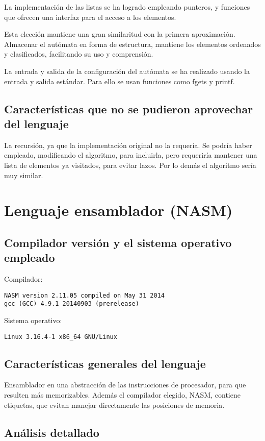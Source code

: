\documentclass[12pt,a4paper]{article}
\begin{document}
La implementación de las listas se ha logrado empleando punteros, y funciones
que ofrecen una interfaz para el acceso a los elementos.

Esta elección mantiene una gran similaritud con la primera aproximación.
Almacenar el autómata en forma de estructura, mantiene los elementos ordenados y
clasificados, facilitando su uso y comprensión.

La entrada y salida de la configuración del autómata se ha realizado usando la
entrada y salida estándar. Para ello se usan funciones como fgets y printf.

\subsection{Características que no se pudieron aprovechar del lenguaje}
La recursión, ya que la implementación original no la requería. Se podría haber
empleado, modificando el algoritmo, para incluirla, pero requeriría mantener una
lista de elementos ya visitados, para evitar lazos. Por lo demás el algoritmo
sería muy similar.


\section{Lenguaje ensamblador (NASM)}
\subsection{Compilador versión y el sistema operativo empleado}
Compilador:
\begin{lstlisting}
NASM version 2.11.05 compiled on May 31 2014
gcc (GCC) 4.9.1 20140903 (prerelease)
\end{lstlisting}
Sistema operativo:
\begin{lstlisting}
Linux 3.16.4-1 x86_64 GNU/Linux
\end{lstlisting}

\subsection{Características generales del lenguaje}
Ensamblador en una abstracción de las instrucciones de procesador, para que
resulten más memorizables. Además el compilador elegido, NASM, contiene
etiquetas, que evitan manejar directamente las posiciones de memoria.

\subsection{Análisis detallado}
\end{document}
